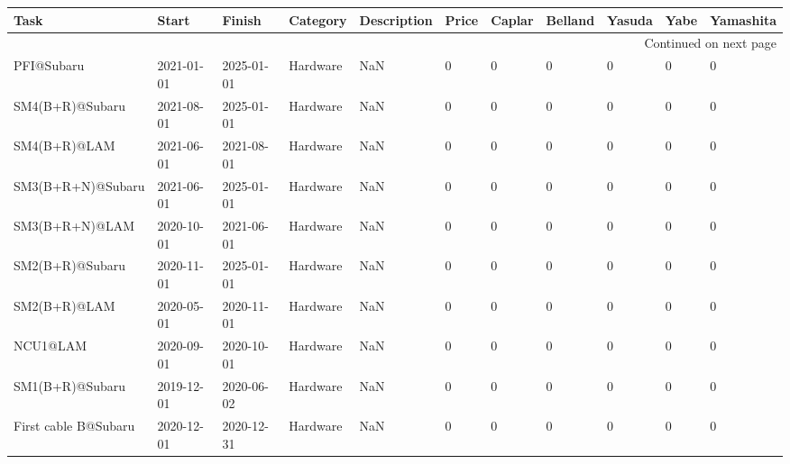 \begin{longtable}{llllp{2cm}llllll}
\toprule
                                        Task &       Start &      Finish &       Category &              Description &  Price &  Caplar &  Belland &  Yasuda &  Yabe &  Yamashita \\
\midrule
\endhead
\midrule
\multicolumn{11}{r}{{Continued on next page}} \\
\midrule
\endfoot

\bottomrule
\endlastfoot
                                  PFI@Subaru &  2021-01-01 &  2025-01-01 &       Hardware &                      NaN &      0 &       0 &        0 &       0 &     0 &          0 \\
                             SM4(B+R)@Subaru &  2021-08-01 &  2025-01-01 &       Hardware &                      NaN &      0 &       0 &        0 &       0 &     0 &          0 \\
                                SM4(B+R)@LAM &  2021-06-01 &  2021-08-01 &       Hardware &                      NaN &      0 &       0 &        0 &       0 &     0 &          0 \\
                           SM3(B+R+N)@Subaru &  2021-06-01 &  2025-01-01 &       Hardware &                      NaN &      0 &       0 &        0 &       0 &     0 &          0 \\
                              SM3(B+R+N)@LAM &  2020-10-01 &  2021-06-01 &       Hardware &                      NaN &      0 &       0 &        0 &       0 &     0 &          0 \\
                             SM2(B+R)@Subaru &  2020-11-01 &  2025-01-01 &       Hardware &                      NaN &      0 &       0 &        0 &       0 &     0 &          0 \\
                                SM2(B+R)@LAM &  2020-05-01 &  2020-11-01 &       Hardware &                      NaN &      0 &       0 &        0 &       0 &     0 &          0 \\
                                    NCU1@LAM &  2020-09-01 &  2020-10-01 &       Hardware &                      NaN &      0 &       0 &        0 &       0 &     0 &          0 \\
                             SM1(B+R)@Subaru &  2019-12-01 &  2020-06-02 &       Hardware &                      NaN &      0 &       0 &        0 &       0 &     0 &          0 \\
                        First cable B@Subaru &  2020-12-01 &  2020-12-31 &       Hardware &                      NaN &      0 &       0 &        0 &       0 &     0 &          0 \\

\end{longtable}
